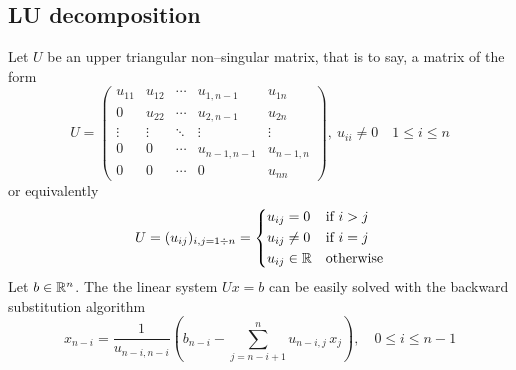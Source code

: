 \subsection{LU decomposition}

Let $U$ be an upper triangular non--singular matrix, that is to say, a matrix of
the form
\begin{equation}
	U = 
	\begin{pmatrix}
		u_{11} 	& u_{12} & \cdots & u_{1,n-1} & u_{1n} \\
		0		& u_{22} & \cdots & u_{2,n-1} & u_{2n} \\
		\vdots	& \vdots & \ddots & \vdots 	  & \vdots \\
		0 		& 0		 & \cdots & u_{n-1,n-1} & u_{n-1,n} \\
		0 	   	& 0		 & \cdots & 0 			& u_{nn}
	\end{pmatrix},
	\
	u_{ii} \neq 0 \quad 1 \leq i \leq n
\end{equation}
or equivalently
\begin{equation}
	U = (u_{ij})_{i, j= 1 \divisionsymbol n} = 
	\left\{
	\begin{aligned}
		&u_{ij} = 0 		& 	&\text{if } i > j \\
		&u_{ij} \neq 0 		& 	&\text{if } i = j \\
		&u_{ij} \in \real 	& 	&\text{otherwise} 
	\end{aligned}
	\right.
\end{equation}
Let $b \in \mathbb{R}^n$. The the linear system $U x = b$ can be easily solved with
the backward substitution algorithm
\begin{equation}
	x_{n-i} =
	\frac{1}{u_{n-i,n-i}}
	\left(
	b_{n-i} - \sum_{j=n-i+1}^{n} u_{n-i,j} \, x_j
	\right),
	\quad 0 \leq i \leq n-1
\end{equation}

